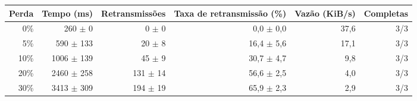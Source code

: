 \begin{tabular}{rrrrrr}
\toprule
Perda & Tempo (ms) & Retransmiss\~oes & Taxa de retransmiss\~ao (\%) & Vaz\~ao (KiB/s) & Completas \\
\midrule
0\% & 260 $\pm$ 0 & 0 $\pm$ 0 & 0,0 $\pm$ 0,0 & 37,6 & 3/3 \\
5\% & 590 $\pm$ 133 & 20 $\pm$ 8 & 16,4 $\pm$ 5,6 & 17,1 & 3/3 \\
10\% & 1006 $\pm$ 139 & 45 $\pm$ 9 & 30,7 $\pm$ 4,7 & 9,8 & 3/3 \\
20\% & 2460 $\pm$ 258 & 131 $\pm$ 14 & 56,6 $\pm$ 2,5 & 4,0 & 3/3 \\
30\% & 3413 $\pm$ 309 & 194 $\pm$ 19 & 65,9 $\pm$ 2,3 & 2,9 & 3/3 \\
\bottomrule
\end{tabular}

